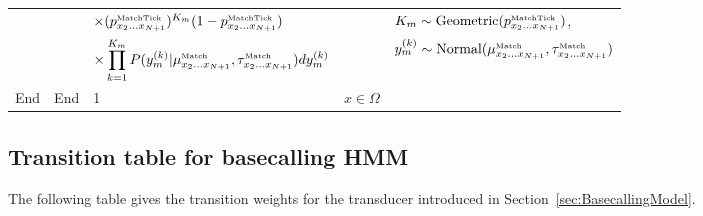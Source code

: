 \documentclass[10pt]{article}
\newcommand{\secref}[1]{Section~\ref{sec:#1}}
\newcommand{\seclabel}[1]{\label{sec:#1}}
\begin{document}
\begin{tabular}{lllll}
& & $\times (p^{\mbox{\tiny MatchTick}}_{x_2\ldots x_{N+1}})^{K_m} (1-p^{\mbox{\tiny MatchTick}}_{x_2\ldots x_{N+1}})$ & & $K_m \sim \mbox{Geometric}(p^{\mbox{\tiny MatchTick}}_{x_2\ldots x_{N+1}})$, \\
& & $\times \displaystyle \prod_{k=1}^{K_m} P(y^{(k)}_m|\mu^{\mbox{\tiny Match}}_{x_2\ldots x_{N+1}},\tau^{\mbox{\tiny Match}}_{x_2\ldots x_{N+1}}) dy^{(k)}_m$ & & $y_m^{(k)} \sim \mbox{Normal}(\mu^{\mbox{\tiny Match}}_{x_2\ldots x_{N+1}},\tau^{\mbox{\tiny Match}}_{x_2\ldots x_{N+1}})$ \\
End & End & 1 & $x \in \Omega$ & \\
\hline
\end{tabular}

\normalsize
\restoregeometry




\subsection{Transition table for basecalling HMM}
\seclabel{HMMTransitionTable}

The following table gives the transition weights for the transducer introduced in \secref{BasecallingModel}.

\small
\end{document}
